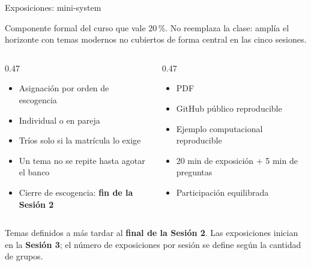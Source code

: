 \documentclass[aspectratio=169,12pt]{beamer}
\begin{document}
\begin{frame}{Exposiciones: mini-system}
  \footnotesize
  \begin{defbox}
    Componente formal del curso que vale 20\,\%. No reemplaza la clase: amplía el horizonte con temas modernos no cubiertos de forma central en las cinco sesiones.
  \end{defbox}
  \begin{columns}[T]
    \begin{column}{0.47\textwidth}
      \begin{taskbox}\scriptsize
        \begin{itemize}
          \item Asignación por orden de escogencia
          \item Individual o en pareja
          \item Tríos solo si la matrícula lo exige
          \item Un tema no se repite hasta agotar el banco
          \item Cierre de escogencia: \textbf{fin de la Sesión 2}
        \end{itemize}
      \end{taskbox}
    \end{column}
    \begin{column}{0.47\textwidth}
      \begin{toolbox}\scriptsize
        \begin{itemize}
          \item PDF
          \item GitHub público reproducible
          \item Ejemplo computacional reproducible
          \item 20 min de exposición + 5 min de preguntas
          \item Participación equilibrada
        \end{itemize}
      \end{toolbox}
    \end{column}
  \end{columns}
  \begin{rulebox}
    \footnotesize Temas definidos a más tardar al \textbf{final de la Sesión 2}. Las exposiciones inician en la \textbf{Sesión 3}; el número de exposiciones por sesión se define según la cantidad de grupos.
  \end{rulebox}
\end{frame}
\end{document}
